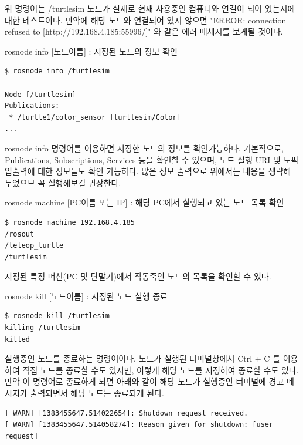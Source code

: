 \noindent
위 명령어는 /turtlesim 노드가 실제로 현재 사용중인 컴퓨터와 연결이 되어 있는지에 대한 테스트이다. 만약에 해당 노드와 연결되어 있지 않으면 "ERROR: connection refused to [http://192.168.4.185:55996/]" 와 같은 에러 메세지를 보게될 것이다.

\vspace{\baselineskip}
\noindent
{}\circled{\thenum} rosnode info [노드이름] : 지정된 노드의 정보 확인
\begin{lstlisting}[language=ROS]
$ rosnode info /turtlesim 
-------------------------------
Node [/turtlesim]
Publications: 
 * /turtle1/color_sensor [turtlesim/Color]
...
\end{lstlisting}

\vspace{\baselineskip}
\noindent
rosnode info 명령어를 이용하면 지정한 노드의 정보를 확인가능하다. 기본적으로, Publications, Subscriptions, Services 등을 확인할 수 있으며, 노드 실행 URI 및 토픽 입출력에 대한 정보들도 확인 가능하다. 많은 정보 출력으로 위에서는 내용을 생략해 두었으므 꼭 실행해보길 권장한다.

\noindent
{}\circled{\thenum} rosnode machine [PC이름 또는 IP] : 해당 PC에서 실행되고 있는 노드 목록 확인
\begin{lstlisting}[language=ROS]
$ rosnode machine 192.168.4.185
/rosout
/teleop_turtle
/turtlesim
\end{lstlisting}

\noindent
지정된 특정 머신(PC 및 단말기)에서 작동죽인 노드의 목록을 확인할 수 있다.

\vspace{\baselineskip}
\noindent
{}\circled{\thenum} rosnode kill [노드이름] : 지정된 노드 실행 종료
\begin{lstlisting}[language=ROS]
$ rosnode kill /turtlesim
killing /turtlesim
killed
\end{lstlisting}

\noindent
실행중인 노드를 종료하는 명령어이다. 노드가 실행된 터미널창에서 Ctrl + C 를 이용하여 직접 노드를 종료할 수도 있지만, 이렇게 해당 노드를 지정하여 종료할 수도 있다. 만약 이 명령어로 종료하게 되면 아래와 같이 해당 노드가 실행중인 터미널에 경고 메시지가 출력되면서 해당 노드는 종료되게 된다.

\vspace{\baselineskip}
\begin{lstlisting}[language=ROS]
[ WARN] [1383455647.514022654]: Shutdown request received.
[ WARN] [1383455647.514058274]: Reason given for shutdown: [user request]
\end{lstlisting}

